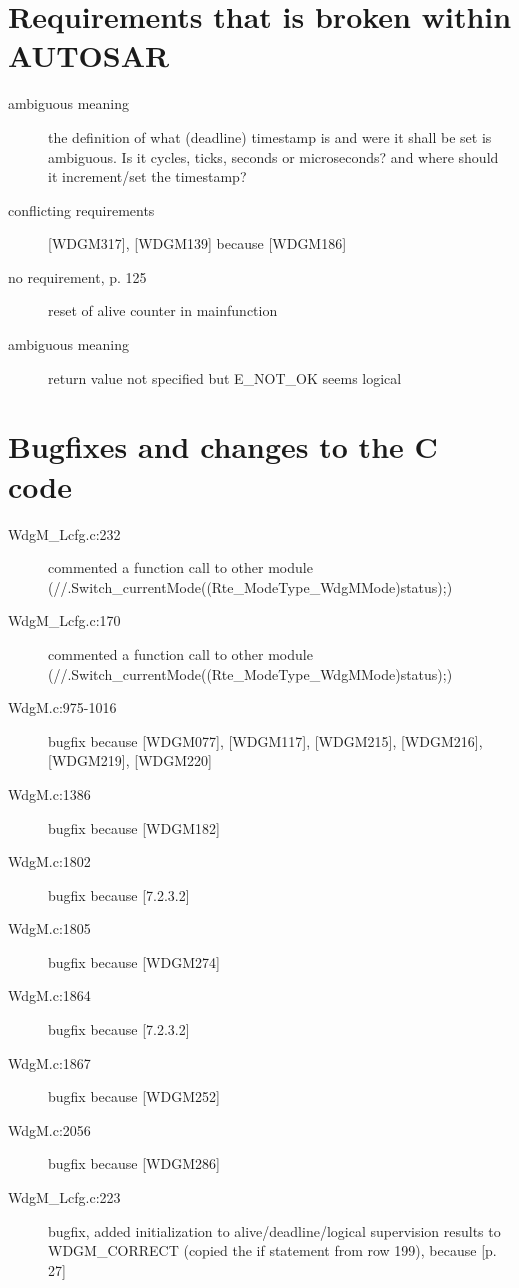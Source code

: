 \documentclass[11pt,a4paper]{article}
\begin{document}
\section{Requirements that is broken within AUTOSAR}
\begin{description}
  \item[ambiguous meaning] the definition of what (deadline) timestamp is and were it shall
    be set is ambiguous. Is it cycles, ticks, seconds or microseconds? and where
    should it increment/set the timestamp?
  \item[conflicting requirements] [WDGM317], [WDGM139] because [WDGM186]
  \item[no requirement, p. 125] reset of alive counter in mainfunction
  \item[ambiguous meaning] return value not specified but E\_NOT\_OK seems logical
\end{description}

\section{Bugfixes and changes to the C code}
\begin{description}
  \item[WdgM\_Lcfg.c:232] \parbox[t]{0.8\linewidth}{commented a function call to other module (//.Switch\_currentMode((Rte\_ModeType\_WdgMMode)status);)}
  \item[WdgM\_Lcfg.c:170] \parbox[t]{0.8\linewidth}{commented a function call to other module
(//.Switch\_currentMode((Rte\_ModeType\_WdgMMode)status);)}
  \item[WdgM.c:975-1016] bugfix because [WDGM077], [WDGM117], [WDGM215], [WDGM216], [WDGM219], [WDGM220]
  \item[WdgM.c:1386] bugfix because [WDGM182]
  \item[WdgM.c:1802] bugfix because [7.2.3.2]
  \item[WdgM.c:1805] bugfix because [WDGM274]
  \item[WdgM.c:1864] bugfix because [7.2.3.2]
  \item[WdgM.c:1867] bugfix because [WDGM252]
  \item[WdgM.c:2056] bugfix because [WDGM286]
  \item[WdgM\_Lcfg.c:223] \parbox[t]{0.8\linewidth}{bugfix, added initialization
      to alive/deadline/logical supervision results to WDGM\_CORRECT (copied the
      if statement from row 199), because [p. 27]}
\end{description}
\end{document}
